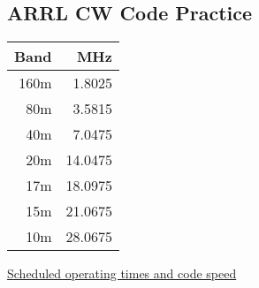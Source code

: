 \documentclass[10pt]{article}
\begin{document}
\begin{multicols}{3}
\section{ARRL CW Code Practice}
\vspace{\baselineskip}
\begin{tabular}{rr}
Band & MHz\\ \hline 
160m & 1.8025 \\  
 80m & 3.5815 \\
 40m & 7.0475 \\
 20m & 14.0475 \\
 17m & 18.0975 \\
 15m & 21.0675 \\
 10m & 28.0675 \\
\end{tabular}
\vspace{\baselineskip}

\href{http://www.arrl.org/w1aw-operating-schedule}{Scheduled operating times and code speed}

\end{multicols}
\end{document}
